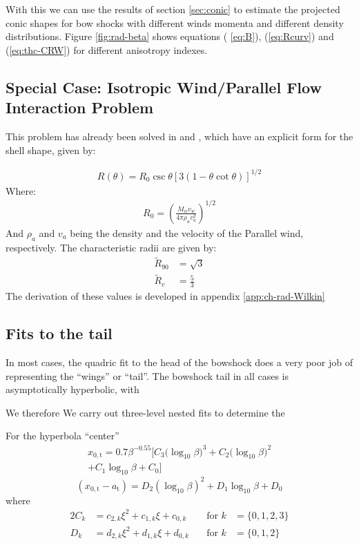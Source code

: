 With this we can use the results of section \ref{sec:conic} to estimate the projected conic shapes for bow shocks with different winds 
momenta and different density distributions. Figure \ref{fig:rad-beta} shows equations ( \ref{eq:B}), (\ref{eq:Rcurv}) and (\ref{eq:thc-CRW}) for different anisotropy indexes. 

\subsection{Special Case: Isotropic Wind/Parallel Flow Interaction Problem}

This problem has already been solved in \citet{Wilkin:1996a} and \CRW{}, which have an explicit form for the shell shape, given by:

\begin{align}
  R(\theta) = R_0\csc\theta\left[3(1-\theta\cot\theta)\right]^{1/2} \label{eq:R-Wilkin}
\end{align}
Where:
\begin{align}
  R_0 = \left(\frac{\dot{M}_wv_w}{4\pi\rho_a v_a^2}\right)^{1/2}
\end{align}
And $\rho_a$ and $v_a$ being the density and the velocity of the Parallel wind, respectively.
The characteristic radii are given by:
\begin{align}
  \tilde{R}_{90} &= \sqrt{3} \\
  \tilde{R}_c &= \frac{5}{3}
\end{align}
The derivation of these values is developed in appendix \ref{app:ch-rad-Wilkin}

\subsection{Fits to the tail}
\label{sec:fits-tail}

In most cases, the quadric fit to the head of the bowshock does a very poor job of representing the ``wings'' or ``tail''.  The bowshock tail in all cases is asymptotically hyperbolic, with 

We therefore 
We carry out three-level nested fits to determine the 

For the hyperbola ``center''
\begin{multline}
  \label{eq:tail-analytic-x0}
  x_{0,\mathrm{t}} = 0.7 \beta^{-0.55} \biggl[
    C_3 \bigl(\log_{10}\beta\bigr)^3 + C_2 \bigl(\log_{10}\beta\bigr)^2 
  \\ + C_1 \log_{10}\beta + C_0
  \biggr]
\end{multline}
\begin{equation}
  \label{eq:tail-analytic-x0-minus-a}
  (x_{0,\mathrm{t}} - a_{\mathrm{t}}) = D_2 (\log_{10}\beta)^2 + D_1 \log_{10}\beta + D_0
\end{equation}
where
\begin{alignat}{2}
  \label{eq:tail-analytic-coeffs-c}
  C_k &= c_{2,k} \xi^2 + c_{1,k} \xi + c_{0,k} &\quad \text{for\ } k &= \{0, 1, 2, 3\} \\
  \label{eq:tail-analytic-coeffs-d}
  D_k &= d_{2,k} \xi^2 + d_{1,k} \xi + d_{0,k} &\quad \text{for\ } k &= \{0, 1, 2\}
\end{alignat}


